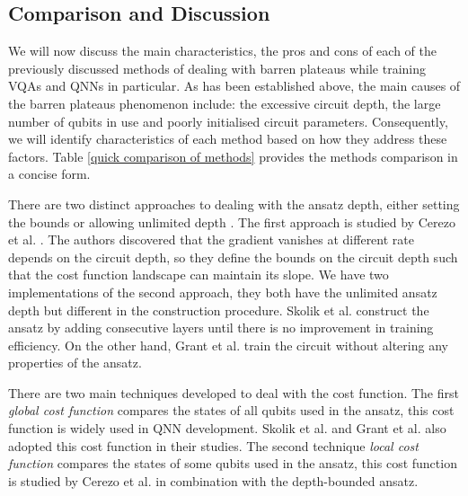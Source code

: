 \subsection{Comparison and Discussion}
We will now discuss the main characteristics, the pros and cons of each of the previously discussed methods of dealing with barren plateaus while training VQAs and QNNs in particular.
As has been established above, the main causes of the barren plateaus phenomenon include: the excessive circuit depth, the large number of qubits in use and poorly initialised circuit parameters.
Consequently, we will identify characteristics of each method based on how they address these factors.
Table \ref{quick comparison of methods} provides the methods comparison in a concise form.

There are two distinct approaches to dealing with the ansatz depth, either setting the bounds \cite{cerezoCostFunctionDependent2021} or allowing unlimited depth \cite{skolikLayerwiseLearningQuantum2021, grantInitializationStrategyAddressing2019}.
The first approach is studied by Cerezo et al. \cite{cerezoCostFunctionDependent2021}.
The authors discovered that the gradient vanishes at different rate depends on the circuit depth, so they define the bounds on the circuit depth such that the cost function landscape can maintain its slope.
We have two implementations of the second approach, they both have the unlimited ansatz depth but different in the construction procedure.
Skolik et al. \cite{skolikLayerwiseLearningQuantum2021} construct the ansatz by adding consecutive layers until there is no improvement in training efficiency.
On the other hand, Grant et al. \cite{grantInitializationStrategyAddressing2019} train the circuit without altering any properties of the ansatz.

There are two main techniques developed to deal with the cost function.
The first \emph{global cost function} compares the states of all qubits used in the ansatz, this cost function is widely used in QNN development.
Skolik et al. and Grant et al. also adopted this cost function in their studies.
The second technique \emph{local cost function} compares the states of some qubits used in the ansatz, this cost function is studied by Cerezo et al. \cite{cerezoCostFunctionDependent2021} in combination with the depth-bounded ansatz.

